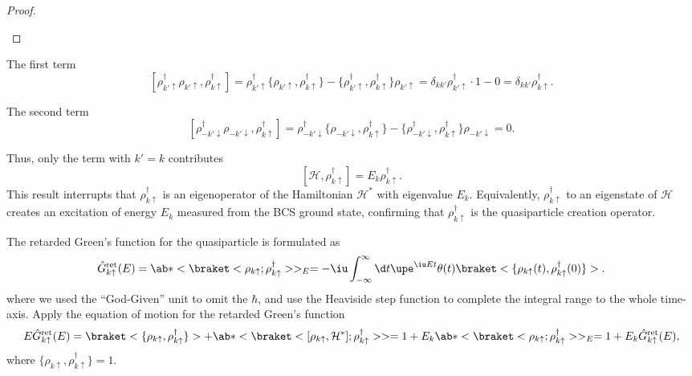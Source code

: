 \begin{solution}
\begin{enumext}
\begin{proof}
\begin{enumext}
    \end{enumext}
    \end{proof}
    \item \begin{enumext}
      \item The first term
      \[
          [ \rho_{k'\uparrow}^\dagger \rho_{k'\uparrow},
            \rho_{k\uparrow}^\dagger ]
        = \rho_{k'\uparrow}^\dagger
          \{\rho_{k'\uparrow}, \rho_{k\uparrow}^\dagger\}
        - \{\rho_{k'\uparrow}^\dagger, \rho_{k\uparrow}^\dagger\}
          \rho_{k'\uparrow}
        = \delta_{kk'} \rho_{k'\uparrow}^\dagger \cdot 1 - 0
        = \delta_{kk'} \rho_{k\uparrow}^\dagger.
      \]
      \item The second term
      \[
        [ \rho_{-k'\downarrow}^\dagger \rho_{-k'\downarrow},
          \rho_{k\uparrow}^\dagger ]
      = \rho_{-k'\downarrow}^\dagger
        \{\rho_{-k'\downarrow}, \rho_{k\uparrow}^\dagger\}
      - \{\rho_{-k'\downarrow}^\dagger, \rho_{k\uparrow}^\dagger\}
        \rho_{-k'\downarrow} = 0.
      \]
    \end{enumext}
    Thus, only the term with $k' = k$ contributes
    \[
      [\mathcal H, \rho_{k\uparrow}^\dagger] = E_k \rho_{k\uparrow}^\dagger.
    \]
    This result interrupts that $\rho_{k\uparrow}^\dagger$ is an eigenoperator
    of the Hamiltonian $\mathcal H^*$ with eigenvalue $E_k$. Equivalently,
    $\rho_{k\uparrow}^\dagger$ to an eigenstate of $\mathcal H$ creates an
    excitation of energy $E_k$ measured from the BCS ground state, confirming
    that $\rho_{k\uparrow}^\dagger$ is the quasiparticle creation operator.
    \item The retarded Green's function for the quasiparticle is formulated as
    \[
      \hat G_{k\uparrow}^\text{ret}(E)
    = \ab*<\braket<\rho_{k\uparrow};\rho_{k\uparrow}^\dagger>>_E
    = -\iu \int_{-\infty}^\infty \d t \upe^{\iu Et} \theta(t)
      \braket<\{\rho_{k\uparrow}(t), \rho_{k\uparrow}^\dagger(0)\}>.
    \]
    where we used the ``God-Given'' unit to omit the $\hbar$, and use the
    Heaviside step function to complete the integral range to the whole
    time-axis. Apply the equation of motion for the retarded Green's function
    \[
      E \hat G_{k\uparrow}^\text{ret}(E)
    = \braket<\{\rho_{k\uparrow}, \rho_{k\uparrow}^\dagger\}>
    + \ab*<\braket<[\rho_{k\uparrow}, \mathcal H^*]; \rho_{k\uparrow}^\dagger>>
    = 1 + E_k \ab*<\braket<\rho_{k\uparrow};\rho_{k\uparrow}^\dagger>>_E
    = 1 + E_k \hat G_{k\uparrow}^\text{ret}(E),
    \]
    where $\{\rho_{k\uparrow}, \rho_{k\uparrow}^\dagger\} = 1$.

\end{enumext}
\end{solution}
